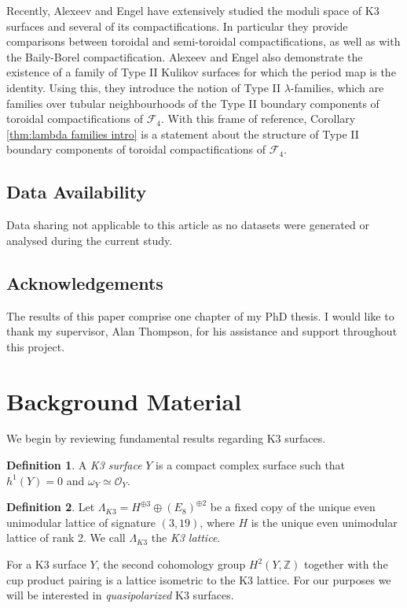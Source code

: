 \documentclass[a4paper]{amsart}
\theoremstyle{definition}
\newtheorem{defn}{Definition}[section]
\theoremstyle{plain}
\theoremstyle{remark}
\newcommand{\Z}{\mathbb{Z}}
\begin{document}
Recently, Alexeev and Engel \cite{AE23} have extensively studied the moduli space of K3 surfaces and several of its compactifications. In particular they provide comparisons between toroidal and semi-toroidal compactifications, as well as with the Baily-Borel compactification. Alexeev and Engel also demonstrate the existence of a family of Type II Kulikov surfaces for which the period map is the identity. Using this, they introduce the notion of Type II $\lambda$-families, which are families over tubular neighbourhoods of the Type II boundary components of toroidal compactifications of $\mathcal{F}_4$. With this frame of reference, Corollary \ref{thm:lambda families intro} is a statement about the structure of Type II boundary components of toroidal compactifications of $\mathcal{F}_4$.
\subsection{Data Availability}
Data sharing not applicable to this article as no datasets
were generated or analysed during the current study.
\subsection{Acknowledgements}
The results of this paper comprise one chapter of my PhD thesis. I would like to thank my supervisor, Alan Thompson, for his assistance and support throughout this project.
\section{Background Material}\label{sect:Background}
We begin by reviewing fundamental results regarding K3 surfaces.

\begin{defn}
A \emph{K3 surface} $Y$ is a compact complex surface such that $h^1(Y)=0$ and $\omega_Y\simeq\mathcal{O}_Y$.
\end{defn}

\begin{defn}
Let $\Lambda_{K3} = H^{\oplus3}\oplus(E_8)^{\oplus2}$ be a fixed copy of the unique even unimodular lattice of signature $(3,19)$, where $H$ is the unique even unimodular lattice of rank 2. We call $\Lambda_{K3}$ the \emph{K3 lattice}.
\end{defn}

For a K3 surface $Y$, the second cohomology group $H^2(Y,\Z)$ together with the cup product pairing is a lattice isometric to the K3 lattice. For our purposes we will be interested in \emph{quasipolarized} K3 surfaces.
\end{document}
